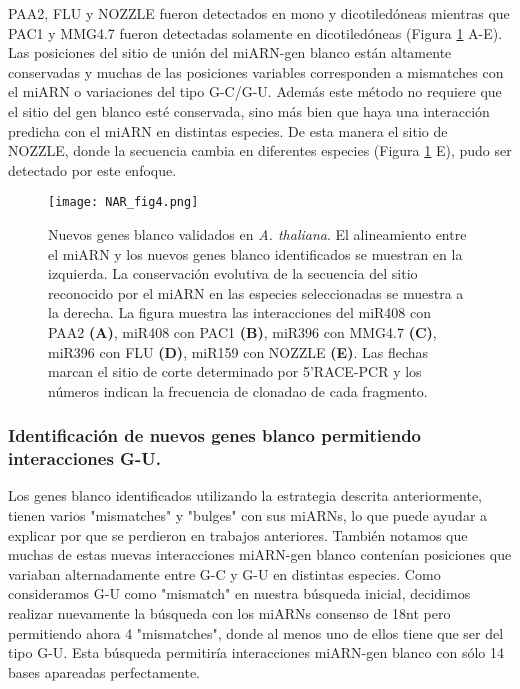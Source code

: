 PAA2, FLU y NOZZLE fueron detectados en mono y dicotiledóneas mientras que PAC1 y MMG4.7 fueron detectadas solamente en dicotiledóneas (Figura \ref{fig:NAR_fig4} A-E).
Las posiciones del sitio de unión del miARN-gen blanco están altamente conservadas y muchas de las posiciones variables corresponden a mismatches con el miARN o variaciones del tipo G-C/G-U.
Además este método no requiere que el sitio del gen blanco esté conservada, sino más bien que haya una interacción predicha con el miARN en distintas especies.
De esta manera el sitio de NOZZLE, donde la secuencia cambia en diferentes especies (Figura \ref{fig:NAR_fig4} E), pudo ser detectado por este enfoque.

\begin{figure}[htbp!] 
    \centering    
    \texttt{[image: NAR\_fig4.png]}
    \caption[Nuevos genes blanco validados en \textit{A. thaliana}.]{Nuevos genes blanco validados en \textit{A. thaliana}. 
    El alineamiento entre el miARN y los nuevos genes blanco identificados se muestran en la izquierda.
    La conservación evolutiva de la secuencia del sitio reconocido por el miARN en las especies seleccionadas se muestra a la derecha. La figura muestra las interacciones del miR408 con PAA2
    \textbf{(A)}, miR408 con PAC1 \textbf{(B)}, miR396 con MMG4.7 \textbf{(C)}, miR396 con FLU \textbf{(D)}, miR159 con NOZZLE \textbf{(E)}.
    Las flechas marcan el sitio de corte determinado por 5’RACE-PCR y los números indican la frecuencia de clonadao de cada fragmento.}
    \label{fig:NAR_fig4}
\end{figure}


\subsubsection{Identificación de nuevos genes blanco permitiendo interacciones G-U.}

Los genes blanco identificados utilizando la estrategia descrita anteriormente, tienen varios "mismatches" y "bulges" con sus miARNs, lo que puede ayudar a explicar por que se perdieron en trabajos anteriores. 
También notamos que muchas de estas nuevas interacciones miARN-gen blanco contenían posiciones que variaban alternadamente entre G-C y G-U en distintas especies.
Como consideramos G-U como "mismatch" en nuestra búsqueda inicial, decidimos realizar nuevamente la búsqueda con los miARNs consenso de 18nt pero permitiendo ahora 4 "mismatches", donde al menos uno de ellos tiene que ser del tipo G-U.
Esta búsqueda permitiría interacciones miARN-gen blanco con sólo 14 bases apareadas perfectamente.

